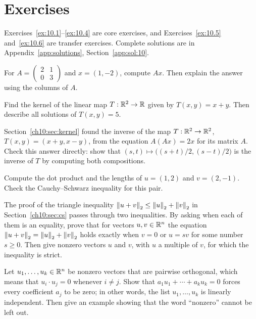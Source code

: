 \section*{Exercises}
Exercises~\ref{ex:10.1}--\ref{ex:10.4} are core exercises, and Exercises~\ref{ex:10.5} and~\ref{ex:10.6} are transfer exercises. Complete solutions are in Appendix~\ref{app:solutions}, Section~\ref{app:sol:10}.
\begin{exercise}\label{ex:10.1}For $A=\begin{pmatrix}2&1\\0&3\end{pmatrix}$ and $x=(1,-2)$, compute $Ax$. Then explain the answer using the columns of $A$.\end{exercise}
\begin{exercise}\label{ex:10.2}Find the kernel of the linear map $T:\mathbb R^2\to\mathbb R$ given by $T(x,y)=x+y$. Then describe all solutions of $T(x,y)=5$.\end{exercise}
\begin{exercise}\label{ex:10.3}Section~\ref{ch10:sec:kernel} found the inverse of the map $T:\mathbb R^2\to\mathbb R^2$, $T(x,y)=(x+y,x-y)$, from the equation $A(Ax)=2x$ for its matrix $A$. Check this answer directly: show that $(s,t)\mapsto\bigl((s+t)/2,(s-t)/2\bigr)$ is the inverse of $T$ by computing both compositions.\end{exercise}
\begin{exercise}\label{ex:10.4}Compute the dot product and the lengths of $u=(1,2)$ and $v=(2,-1)$. Check the Cauchy--Schwarz inequality for this pair.\end{exercise}
\begin{exercise}\label{ex:10.5}The proof of the triangle inequality $\left\|u+v\right\|_2\le\left\|u\right\|_2+\left\|v\right\|_2$ in Section~\ref{ch10:sec:cs} passes through two inequalities. By asking when each of them is an equality, prove that for vectors $u,v\in\mathbb R^n$ the equation $\left\|u+v\right\|_2=\left\|u\right\|_2+\left\|v\right\|_2$ holds exactly when $v=0$ or $u=sv$ for some number $s\ge0$. Then give nonzero vectors $u$ and $v$, with $u$ a multiple of $v$, for which the inequality is strict.\end{exercise}
\begin{exercise}\label{ex:10.6}Let $u_1,\ldots,u_k\in\mathbb R^n$ be nonzero vectors that are pairwise orthogonal, which means that $u_i\cdot u_j=0$ whenever $i\ne j$. Show that $a_1u_1+\cdots+a_ku_k=0$ forces every coefficient $a_j$ to be zero; in other words, the list $u_1,\ldots,u_k$ is linearly independent. Then give an example showing that the word ``nonzero'' cannot be left out.\end{exercise}
